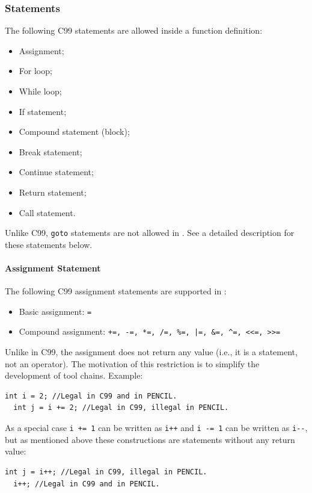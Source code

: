 \subsubsection{Statements}
The following C99 statements are allowed inside a \pencil function definition:
\begin{itemize}
  \item Assignment;
  \item For loop;
  \item While loop;
  \item If statement;
  \item Compound statement (block);
  \item Break statement;
  \item Continue statement;
  \item Return statement;
  \item Call statement.
\end{itemize}
Unlike C99, \lstinline!goto! statements are not allowed in \pencil.
See a detailed description for these statements below.

\paragraph{Assignment Statement}
\label{sec:assignments}
The following C99 assignment statements are supported in \pencil:
\begin{itemize}
  \item Basic assignment: \lstinline!=!
  \item Compound assignment: \lstinline{+=, -=, *=, /=, %=, |=, &=, ^=, <<=, >>=}
\end{itemize}

Unlike in C99, the \pencil assignment does not return any value (i.e.,
it is a statement, not an operator).
The motivation of this restriction is to simplify the development of
\pencil tool chains.
Example:
\begin{lstlisting}[language=pencil]
  int i = 2; //Legal in C99 and in PENCIL.
  int j = i += 2; //Legal in C99, illegal in PENCIL.
\end{lstlisting}

As a special case \lstinline!i += 1! can be written as \lstinline!i++!
and \lstinline!i -= 1! can be written as \lstinline!i--!, but as mentioned
above these constructions are statements without any return value:

\begin{lstlisting}[language=pencil]
  int j = i++; //Legal in C99, illegal in PENCIL.
  i++; //Legal in C99 and in PENCIL.
\end{lstlisting}

